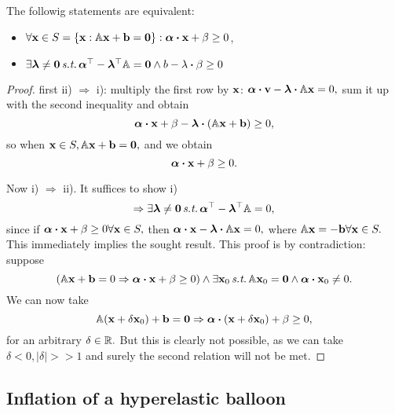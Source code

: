 \documentclass[reqno, a4paper]{article}
\begin{document}
\begin{theorem}
    The followig statements are equivalent:

    \begin{itemize}
	    \item $\forall \vb{x} \in S = \qty{\vb{x}: \tensorq{A}\vb{x}+\vb{b} = \vb{0}}: \vb*{\alpha} \vdot \vb{x} + \beta \geq 0$,
	    \item $\exists \vb*{\lambda} \neq \vb{0} \, \text{\textit{s.t.}} \, \transpose{\vb*{\alpha}} - \transpose{\vb*{\lambda}} \tensorq{A} = \vb{0} \wedge b - \lambda \vdot \beta \geq 0$
    \end{itemize}
\end{theorem}
\begin{proof}
	first ii) $\Rightarrow$ i): multiply the first row by $\vb{x}$: $\vb*{\alpha} \vdot \vb{v} - \vb*{\lambda} \vdot \tensorq{A} \vb{x} = 0,$ sum it up with the second inequality and obtain
	\[
		\vb*{\alpha} \vdot \vb{x} + \beta - \vb*{\lambda} \vdot \qty(\tensorq{A} \vb{x}+\vb{b}) \geq 0,
	\]
	so when $\vb{x} \in S, \mathbb{A}\vb{x} + \vb{b} = \vb{0},$ and we obtain
	\[
		\vb*{\alpha} \vdot \vb{x} + \beta \geq 0.
	\]

	Now i) $\Rightarrow$ ii). It suffices to show i)
	\[
		\Rightarrow \exists \vb*{\lambda} \neq \vb{0} \, \text{\textit{s.t.}} \, \vb*{\alpha}^\top - \vb*{\lambda}^\top\mathbb{A} =0,
	\]
	since if $\vb*{\alpha} \vdot \vb{x} + \beta \geq 0 \forall \vb{x}\in S, $ then $\vb*{\alpha} \vdot \vb{x} - \vb*{\lambda} \vdot \tensorq{A}\vb{x} = 0, $  where $\mathbb{A} \vb{x} = - \vb{b} \forall \vb{x} \in S.$ This immediately implies the sought result.
	This proof is by contradiction: suppose
	\[
		\qty(\tensorq{A}\vb{x} + \vb{b} = 0 \Rightarrow \vb*{\alpha} \vdot \vb{x} + \beta \geq 0) \wedge \exists \vb{x}_0 \, \text{\textit{s.t.}} \, \tensorq{A}\vb{x}_0 = \vb{0} \wedge \vb*{\alpha} \vdot \vb{x}_0 \neq 0.
	\]
	We can now take
	\[
		\tensorq{A}\qty(\vb{x} + \delta \vb{x}_0) + \vb{b} = \vb{0} \Rightarrow \vb*{\alpha} \vdot \qty(\vb{x} + \delta \vb{x}_0) + \beta \geq 0,
	\]
	for an arbitrary $\delta \in {\mathbb R}.$ But this is clearly not possible, as we can take $\delta < 0, |\delta| >> 1$ and surely the second relation will not be met.
\end{proof}

\subsection{Inflation of a hyperelastic balloon}
\label{sec:inflation}
\end{document}

